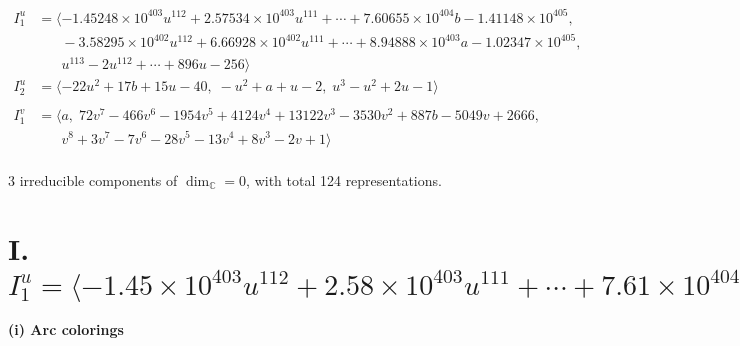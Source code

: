 \documentclass[1p]{elsarticle_modified}
\theoremstyle{definition}
\begin{document}
\begin{align*}
I^u_{1}&=\langle 
-1.45248\times10^{403} u^{112}+2.57534\times10^{403} u^{111}+\cdots+7.60655\times10^{404} b-1.41148\times10^{405},\\
\phantom{I^u_{1}}&\phantom{= \langle  }-3.58295\times10^{402} u^{112}+6.66928\times10^{402} u^{111}+\cdots+8.94888\times10^{403} a-1.02347\times10^{405},\\
\phantom{I^u_{1}}&\phantom{= \langle  }u^{113}-2 u^{112}+\cdots+896 u-256\rangle \\
I^u_{2}&=\langle 
-22 u^2+17 b+15 u-40,\;- u^2+a+u-2,\;u^3- u^2+2 u-1\rangle \\
\\
I^v_{1}&=\langle 
a,\;72 v^7-466 v^6-1954 v^5+4124 v^4+13122 v^3-3530 v^2+887 b-5049 v+2666,\\
\phantom{I^v_{1}}&\phantom{= \langle  }v^8+3 v^7-7 v^6-28 v^5-13 v^4+8 v^3-2 v+1\rangle \\
\end{align*}
\raggedright * 3 irreducible components of $\dim_{\mathbb{C}}=0$, with total 124 representations.\\
\newpage
\renewcommand{\arraystretch}{1}
\centering \section*{I. $I^u_{1}= \langle -1.45\times10^{403} u^{112}+2.58\times10^{403} u^{111}+\cdots+7.61\times10^{404} b-1.41\times10^{405},\;-3.58\times10^{402} u^{112}+6.67\times10^{402} u^{111}+\cdots+8.95\times10^{403} a-1.02\times10^{405},\;u^{113}-2 u^{112}+\cdots+896 u-256 \rangle$}
\flushleft \textbf{(i) Arc colorings}\\
\end{document}
